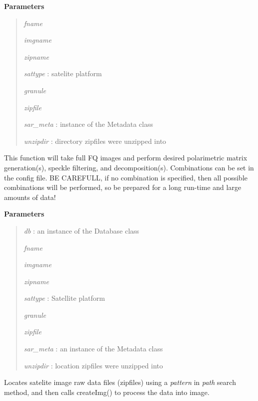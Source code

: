 \documentclass[letterpaper,10pt,openany,oneside]{sphinxmanual}
\begin{document}
\begin{fulllineitems}
\begin{fulllineitems}
\textbf{Parameters}
\begin{quote}

\emph{fname}

\emph{imgname}

\emph{zipname}

\emph{sattype}  : satelite platform

\emph{granule}

\emph{zipfile}

\emph{sar\_meta} : instance of the Metadata class

\emph{unzipdir} : directory zipfiles were unzipped into
\end{quote}

\end{fulllineitems}


\begin{fulllineitems}
\label{code:SigLib.SigLib.polarimetric}
This function will take full FQ images and perform desired polarimetric matrix generation(s), speckle filtering, and decomposition(s). 
Combinations can be set in the config file. BE CAREFULL, if no combination is specified, then all possible combinations will be performed, 
so be prepared for a long run-time and large amounts of data!

\textbf{Parameters}
\begin{quote}

\emph{db} : an instance of the Database class

\emph{fname}

\emph{imgname}

\emph{zipname}

\emph{sattype} : Satellite platform

\emph{granule}

\emph{zipfile}

\emph{sar\_meta} : an instance of the Metadata class

\emph{unzipdir} : location zipfiles were unzipped into
\end{quote}

\end{fulllineitems}


\begin{fulllineitems}
\label{code:SigLib.SigLib.proc_Dir}
Locates satelite image raw data files (zipfiles) using a
\emph{pattern} in \emph{path} search method, and then calls createImg()
to process the data into image.


\end{fulllineitems}
\end{fulllineitems}
\end{document}
